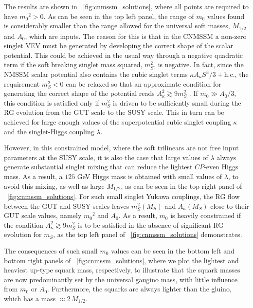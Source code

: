 \documentclass[final,3p,11pt,pdflatex]{elsarticle}
\newcommand{\MS}{\ensuremath{M_S}\xspace}
\newcommand{\figref}[1]{\figurename~\ref{#1}}
\newcommand{\CP}{\ensuremath{CP}\xspace}
\newcommand{\azero}{\ensuremath{A_0}\xspace}
\newcommand{\mhalf}{\ensuremath{M_{1/2}}\xspace}
\newcommand{\mzero}{\ensuremath{m_0}\xspace}
\begin{document}
The results are shown in \figref{fig:cnmssm_solutions}, where all points are
required to have $\mzero^2 > 0$.  As can be seen in the top left panel, the range
of $\mzero$ values found is considerably smaller than the range allowed for the
universal soft masses, $\mhalf$ and $\azero$, which are inputs.  The reason for
this is that in the CNMSSM a non-zero singlet VEV must be generated by
developing the correct shape of the scalar potential.  This could be achieved
in the usual way through a negative quadratic term if the soft breaking singlet
mass squared, $m_S^2$, is negative.  In fact, since the NMSSM scalar potential
also contains the cubic singlet terms $\kappa A_\kappa S^3 / 3 + \mathrm{h.c.}$,
the requirement $m_S^2 < 0$ can be relaxed so that an approximate condition for
generating the correct shape of the potential reads $A_\kappa^2 \gtrsim
9 m_S^2$ \cite{Ellwanger:1996gw,Derendinger:1983bz}.  If $\mzero \gg
\azero / 3$, this condition is satisfied only if $m_S^2$ is driven to be
sufficiently small during the RG evolution from the GUT scale to the SUSY
scale.  This in turn can be achieved for large enough values of the
superpotential cubic singlet coupling $\kappa$ and the singlet-Higgs coupling
$\lambda$.

However, in this constrained model, where the soft trilinears are not free
input parameters at the SUSY scale, it is also the case that large values of $\lambda$
always generate substantial singlet mixing that can reduce the lightest
\CP-even Higgs mass.  As a result, a $125$ GeV Higgs mass is obtained with small
values of $\lambda$, to avoid this mixing, as well as large $\mhalf$, as can be
seen in the top right panel of \figref{fig:cnmssm_solutions}.  For such small
singlet Yukawa couplings, the RG flow between the GUT and SUSY scales leaves
$m_S^2(\MS)$ and $A_\kappa(\MS)$ close to their GUT scale values, namely
$\mzero^2$ and $\azero$.  As a result, $\mzero$ is heavily constrained if
the condition $A_\kappa^2 \gtrsim 9 m_S^2$ is to be satisfied in the absence of
significant RG evolution for $m_S$, as the top left panel of
\figref{fig:cnmssm_solutions} demonstrates.

The consequences of such small $\mzero$ values can be seen in the bottom left
and bottom right panels of \figref{fig:cnmssm_solutions}, where we plot the
lightest and heaviest up-type squark mass, respectively, to illustrate that the
squark masses are now predominantly set by the universal gaugino mass, with
little influence from $\mzero$ or $\azero$.  Furthermore, the squarks are always
lighter than the gluino, which has a mass $\approx 2\, \mhalf$.
\end{document}
